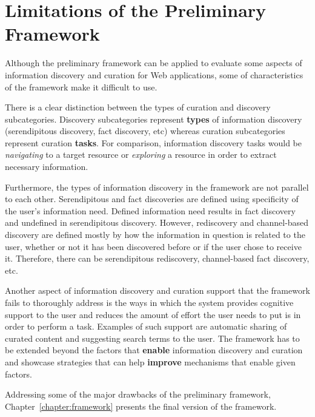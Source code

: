 {\section{Limitations of the Preliminary Framework}
Although the preliminary framework can be applied to evaluate some aspects of information discovery and curation for Web applications, some of characteristics of the framework make it difficult to use.

There is a clear distinction between the types of curation and discovery subcategories. Discovery subcategories represent \textbf{types} of information discovery (serendipitous discovery, fact discovery, etc) whereas curation subcategories represent curation \textbf{tasks}. For comparison, information discovery tasks would be \textit{navigating} to a target resource or \textit{exploring} a resource in order to extract necessary information.

Furthermore, the types of information discovery in the framework are not parallel to each other. Serendipitous and fact discoveries are defined using specificity of the user's information need. Defined information need results in fact discovery and undefined in serendipitous discovery. However, rediscovery and channel-based discovery are defined mostly by how the information in question is related to the user, whether or not it has been discovered before or if the user chose to receive it. Therefore, there can be serendipitous rediscovery, channel-based fact discovery, etc. 

Another aspect of information discovery and curation support that the framework fails to thoroughly address is the ways in which the system provides cognitive support to the user and reduces the amount of effort the user needs to put is in order to perform a task. Examples of such support are automatic sharing of curated content and suggesting search terms to the user. The framework has to be extended beyond the factors that \textbf{enable} information discovery and curation and showcase strategies that can help \textbf{improve} mechanisms that enable given factors.

Addressing some of the major drawbacks of the preliminary framework, Chapter~\ref{chapter:framework} presents the final version of the framework. 
} %


